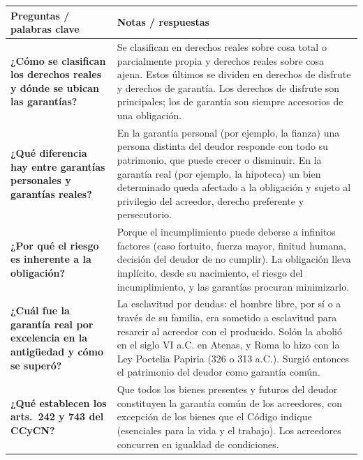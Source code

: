 \documentclass[12pt,oneside]{book}
\begin{document}
\begin{longtable}{
    >{\raggedright\arraybackslash}p{}
    >{\raggedright\arraybackslash}p{}
}
\toprule
\textbf{Preguntas / palabras clave} & \textbf{Notas / respuestas} \\
\midrule
\endhead
\bottomrule
\endfoot

\textbf{¿Cómo se clasifican los derechos reales y dónde se ubican las garantías?} &
Se clasifican en derechos reales sobre cosa total o parcialmente propia y derechos reales sobre cosa ajena. Estos últimos se dividen en derechos de disfrute y derechos de garantía. Los derechos de disfrute son principales; los de garantía son siempre accesorios de una obligación. \\[0.6em]

\textbf{¿Qué diferencia hay entre garantías personales y garantías reales?} &
En la garantía personal (por ejemplo, la fianza) una persona distinta del deudor responde con todo su patrimonio, que puede crecer o disminuir. En la garantía real (por ejemplo, la hipoteca) un bien determinado queda afectado a la obligación y sujeto al privilegio del acreedor, derecho preferente y persecutorio. \\[0.6em]

\textbf{¿Por qué el riesgo es inherente a la obligación?} &
Porque el incumplimiento puede deberse a infinitos factores (caso fortuito, fuerza mayor, finitud humana, decisión del deudor de no cumplir). La obligación lleva implícito, desde su nacimiento, el riesgo del incumplimiento, y las garantías procuran minimizarlo. \\[0.6em]

\textbf{¿Cuál fue la garantía real por excelencia en la antigüedad y cómo se superó?} &
La esclavitud por deudas: el hombre libre, por sí o a través de su familia, era sometido a esclavitud para resarcir al acreedor con el producido. Solón la abolió en el siglo VI a.C. en Atenas, y Roma lo hizo con la Ley Poetelia Papiria (326 o 313 a.C.). Surgió entonces el patrimonio del deudor como garantía común. \\[0.6em]

\textbf{¿Qué establecen los arts.~242 y 743 del CCyCN?} &
Que todos los bienes presentes y futuros del deudor constituyen la garantía común de los acreedores, con excepción de los bienes que el Código indique (esenciales para la vida y el trabajo). Los acreedores concurren en igualdad de condiciones. \\[0.6em]


\end{longtable}
\end{document}
